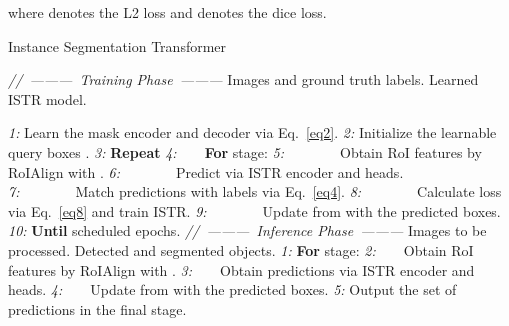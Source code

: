 \documentclass[10pt,twocolumn,letterpaper]{article}
\begin{document}
where  denotes the L2 loss and  denotes the dice loss.
\begin{algorithm}[t]
\caption{Instance Segmentation Transformer}
\label{alg1}
\begin{algorithmic}
 \STATE \textit{//\ ---------\ Training Phase\ ---------}
  Images and ground truth labels.
  Learned ISTR model.

 \STATE \textit{1:} Learn the mask encoder and decoder via Eq.~\ref{eq2}.
 \STATE \textit{2:} Initialize the learnable query boxes .
 \STATE \textit{3:} \textbf{Repeat}
 \STATE \textit{4:}\ \ \ \ \textbf{For}  stage:
 \STATE \textit{5:}\ \ \ \ \ \ \ \ Obtain RoI features by RoIAlign with .
 \STATE \textit{6:}\ \ \ \ \ \ \ \ Predict via ISTR encoder and heads.
 \STATE \textit{7:}\ \ \ \ \ \ \ \ Match predictions with labels via Eq.~\ref{eq4}.
 \STATE \textit{8:}\ \ \ \ \ \ \ \ Calculate loss via Eq.~\ref{eq8} and train ISTR.
 \STATE \textit{9:}\ \ \ \ \ \ \ \ Update  from  with the predicted boxes.
 \STATE \textit{10:} \textbf{Until} scheduled epochs.
\STATE \textit{//\ ---------\ Inference Phase\ ---------}
  Images to be processed.
  Detected and segmented objects.
 \STATE \textit{1:} \textbf{For}  stage:
 \STATE \textit{2:}\ \ \ \ Obtain RoI features by RoIAlign with .
 \STATE \textit{3:}\ \ \ \ Obtain predictions via ISTR encoder and heads.
 \STATE \textit{4:}\ \ \ \ Update  from  with the predicted boxes.
 \STATE \textit{5:} Output the set of predictions in the final stage.
 \end{algorithmic}
\end{algorithm}
\end{document}
